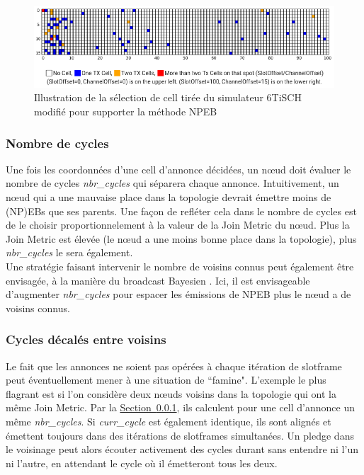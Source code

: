 \documentclass[]{report}
\newcommand{\wordlink}[2]{\hyperref[#2]{#1~\ref{#2}}}
\begin{document}
\newpage

 \vspace{1cm}
	\begin{figure}[!h]
	\centering
	\includegraphics[width=0.95\linewidth]{NPEB_cell}
	\caption{Illustration de la sélection de cell tirée du simulateur 6TiSCH \cite{simulating-6TiSCH} modifié pour supporter la méthode NPEB}
	\label{fig:NPEB_cells}
	\end{figure}

\vspace{0.6cm}

\subsubsection{Nombre de cycles}
\label{NPEBopti_nbr_cycles}

Une fois les coordonnées d'une cell d'annonce décidées, un nœud doit évaluer le nombre de cycles \textit{nbr\_cycles} qui séparera chaque annonce. Intuitivement, un nœud qui a une mauvaise place dans la topologie devrait émettre moins de (NP)EBs que ses parents. Une façon de refléter cela dans le nombre de cycles est de le choisir proportionnelement à la valeur de la Join Metric du nœud. Plus la Join Metric est élevée (le nœud a une moins bonne place dans la topologie), plus \textit{nbr\_cycles} le sera également.\\

Une stratégie faisant intervenir le nombre de voisins connus peut également être envisagée, à la manière du broadcast Bayesien \cite{broadcast-strategies}. Ici, il est envisageable d'augmenter \textit{nbr\_cycles} pour espacer les émissions de NPEB plus le nœud a de voisins connus.
~\\
\subsubsection{Cycles décalés entre voisins}

Le fait que les annonces ne soient pas opérées à chaque itération de slotframe peut éventuellement mener à une situation de ``famine". L'exemple le plus flagrant est si l'on considère deux nœuds voisins dans la topologie qui ont la même Join Metric. Par la \wordlink{Section}{NPEBopti_nbr_cycles}, ils calculent pour une cell d'annonce un même \textit{nbr\_cycles}. Si \textit{curr\_cycle} est également identique, ils sont alignés et émettent toujours dans des itérations de slotframes simultanées. Un pledge dans le voisinage peut alors écouter activement des cycles durant sans entendre ni l'un ni l'autre, en attendant le cycle où il émetteront tous les deux.\\
\end{document}
